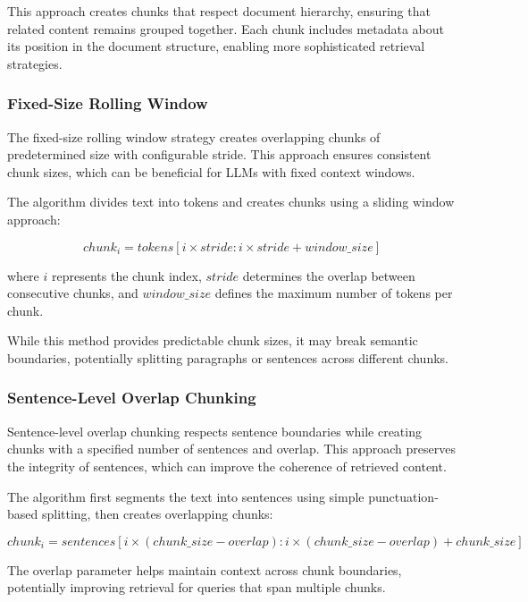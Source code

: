 \documentclass[11pt,a4paper]{article}
\begin{document}
This approach creates chunks that respect document hierarchy, ensuring that related content remains grouped together. Each chunk includes metadata about its position in the document structure, enabling more sophisticated retrieval strategies.

\subsubsection{Fixed-Size Rolling Window}

The fixed-size rolling window strategy creates overlapping chunks of predetermined size with configurable stride. This approach ensures consistent chunk sizes, which can be beneficial for LLMs with fixed context windows.

The algorithm divides text into tokens and creates chunks using a sliding window approach:

\begin{equation}
chunk_i = tokens[i \times stride : i \times stride + window\_size]
\end{equation}

where $i$ represents the chunk index, $stride$ determines the overlap between consecutive chunks, and $window\_size$ defines the maximum number of tokens per chunk.

While this method provides predictable chunk sizes, it may break semantic boundaries, potentially splitting paragraphs or sentences across different chunks.

\subsubsection{Sentence-Level Overlap Chunking}

Sentence-level overlap chunking respects sentence boundaries while creating chunks with a specified number of sentences and overlap. This approach preserves the integrity of sentences, which can improve the coherence of retrieved content.

The algorithm first segments the text into sentences using simple punctuation-based splitting, then creates overlapping chunks:

\begin{equation}
chunk_i = sentences[i \times (chunk\_size - overlap) : i \times (chunk\_size - overlap) + chunk\_size]
\end{equation}

The overlap parameter helps maintain context across chunk boundaries, potentially improving retrieval for queries that span multiple chunks.
\end{document}

